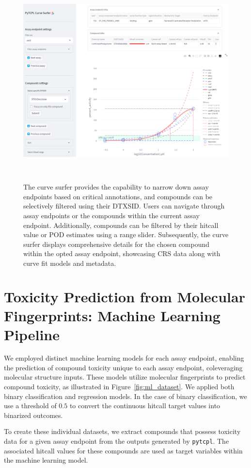 \begin{figure}  %
    \centering
    \includegraphics[width=1.0\textwidth]{figures/curve_surfer.png}
    \caption{The curve surfer provides the capability to narrow down assay endpoints based on critical annotations, and compounds can be selectively filtered using their DTXSID. Users can navigate through assay endpoints or the compounds within the current assay endpoint. Additionally, compounds can be filtered by their hitcall value or POD estimates using a range slider. Subsequently, the curve surfer displays comprehensive details for the chosen compound within the opted assay endpoint, showcasing CRS data along with curve fit models and metadata.}
~\label{fig:curve_surfer}
\end{figure}


\section{Toxicity Prediction from Molecular Fingerprints: Machine Learning Pipeline}
We employed distinct machine learning models for each assay endpoint, enabling the prediction of compound toxicity unique to each assay endpoint, coleveraging molecular structure inputs.
These models utilize molecular fingerprints to predict compound toxicity, as illustrated in Figure~\ref{fig:ml_dataset}. We applied both binary classification and regression models. In the case of binary classification, we use a threshold of $0.5$ to convert the continuous hitcall target values into binarized outcomes.

To create these individual datasets, we extract compounds that possess toxicity data for a given assay endpoint from the outputs generated by \texttt{pytcpl}. The associated hitcall values for these compounds are used as target variables within the machine learning model.

